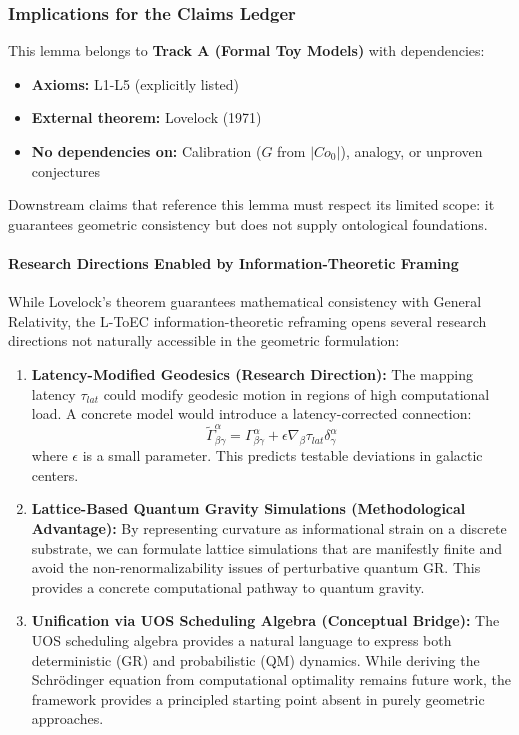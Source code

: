 \documentclass[11pt,titlepage]{article}
\begin{document}
\subsubsection{Implications for the Claims Ledger}
This lemma belongs to \textbf{Track A (Formal Toy Models)} with dependencies:
\begin{itemize}
\item \textbf{Axioms:} L1-L5 (explicitly listed)
\item \textbf{External theorem:} Lovelock (1971)
\item \textbf{No dependencies on:} Calibration ($G$ from $|Co_0|$), analogy, or unproven conjectures
\end{itemize}

Downstream claims that reference this lemma must respect its limited scope: it guarantees geometric consistency but does not supply ontological foundations.


\paragraph{Research Directions Enabled by Information-Theoretic Framing}
While Lovelock's theorem guarantees mathematical consistency with General Relativity, the L-ToEC information-theoretic reframing opens several research directions not naturally accessible in the geometric formulation:

\begin{enumerate}
    \item \textbf{Latency-Modified Geodesics (Research Direction):} The mapping latency $\tau_{lat}$ could modify geodesic motion in regions of high computational load. A concrete model would introduce a latency-corrected connection:
    \[
    \tilde{\Gamma}^\alpha_{\beta\gamma} = \Gamma^\alpha_{\beta\gamma} + \epsilon \nabla_\beta \tau_{lat} \delta^\alpha_\gamma
    \]
    where $\epsilon$ is a small parameter. This predicts testable deviations in galactic centers.
    
    \item \textbf{Lattice-Based Quantum Gravity Simulations (Methodological Advantage):} By representing curvature as informational strain on a discrete substrate, we can formulate lattice simulations that are manifestly finite and avoid the non-renormalizability issues of perturbative quantum GR. This provides a concrete computational pathway to quantum gravity.
    
    \item \textbf{Unification via UOS Scheduling Algebra (Conceptual Bridge):} The UOS scheduling algebra provides a natural language to express both deterministic (GR) and probabilistic (QM) dynamics. While deriving the Schr\"odinger equation from computational optimality remains future work, the framework provides a principled starting point absent in purely geometric approaches.
\end{enumerate}
\end{document}
